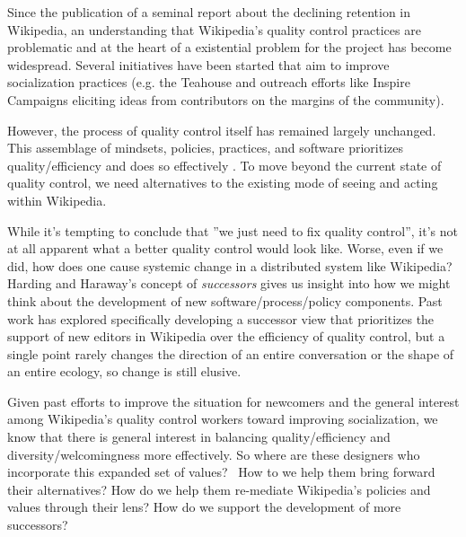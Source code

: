 Since the publication of a seminal report about the declining retention in Wikipedia, an understanding that Wikipedia's quality control practices are problematic and at the heart of a existential problem for the project has become widespread.  Several initiatives have been started that aim to improve socialization practices (e.g. the Teahouse and outreach efforts like Inspire Campaigns\cite{morgan2015what} eliciting ideas from contributors on the margins of the community).

However, the process of quality control itself has remained largely unchanged.  This assemblage of mindsets, policies, practices, and software prioritizes quality/efficiency and does so effectively \cite{geiger2013levee}\cite{halfaker2014snuggle}.  To move beyond the current state of quality control, we need alternatives to the existing mode of seeing and acting within Wikipedia.

While it's tempting to conclude that ''we just need to fix quality control'', it's not at all apparent what a better quality control would look like.  Worse, even if we did, how does one cause systemic change in a distributed system like Wikipedia?  Harding and Haraway's concept of \emph{successors}\cite{haraway1988situated}\cite{harding1987feminism} gives us insight into how we might think about the development of new software/process/policy components.  Past work has explored specifically developing a successor view that prioritizes the support of new editors in Wikipedia over the efficiency of quality control\cite{halfaker2014snuggle}\cite{geiger2014successor}, but a single point rarely changes the direction of an entire conversation or the shape of an entire ecology, so change is still elusive.

Given past efforts to improve the situation for newcomers\cite{morgan2013tea} and the general interest among Wikipedia's quality control workers toward improving socialization\cite{halfaker2014snuggle}, we know that there is general interest in balancing quality/efficiency and diversity/welcomingness more effectively.  So where are these designers who incorporate this expanded set of values?  How to we help them bring forward their alternatives?  How do we help them re-mediate Wikipedia's policies and values through their lens?  How do we support the development of more successors?

